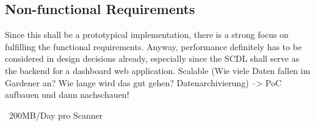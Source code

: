 \subsection{Non-functional Requirements}
Since this shall be a prototypical implementation, there is a strong focus on fulfilling the functional requirements. Anyway, performance definitely has to be considered in design decisions already, especially since the SCDL shall serve as the backend for a dashboard web application.
Scalable (Wie viele Daten fallen im Gardener an? Wie lange wird das gut gehen? Datenarchivierung) --> PoC aufbauen und dann nachschauen! 

~200MB/Day pro Scanner

